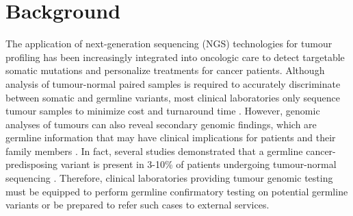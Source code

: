 \documentclass{bmcart}
\begin{document}
\begin{frontmatter}
\begin{abstractbox}
\begin{keyword}
\end{keyword}


\end{abstractbox}
%

\end{frontmatter}



\section*{Background}

The application of next-generation sequencing (NGS) technologies for tumour profiling has been increasingly integrated into oncologic care to detect targetable somatic mutations and personalize treatments for cancer patients. Although analysis of tumour-normal paired samples is required to accurately discriminate between somatic and germline variants, most clinical laboratories only sequence tumour samples to minimize cost and turnaround time \cite{Raymond2016}. However, genomic analyses of tumours can also reveal secondary genomic findings, which are germline information that may have clinical implications for patients and their family members \cite{Raymond2016}. In fact, several studies demonstrated that a germline cancer-predisposing variant is present in 3-10\% of patients undergoing tumour-normal sequencing \cite{Raymond2016,Meric-Bernstam2016,Schrader2015,Jones2015}. Therefore, clinical laboratories providing tumour genomic testing must be equipped to perform germline confirmatory testing on potential germline variants or be prepared to refer such cases to external services.
\end{document}
